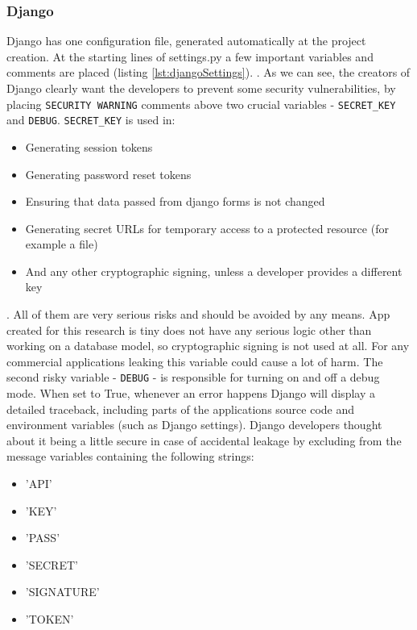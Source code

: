 \subsubsection{Django}
Django has one configuration file, generated automatically at the project creation. At the starting lines of settings.py a few important variables and comments are placed (listing \ref{lst:djangoSettings}).
.
As we can see, the creators of Django clearly want the developers to prevent some security vulnerabilities, by placing \lstinline{SECURITY WARNING} comments above two crucial variables - \lstinline{SECRET_KEY} and \lstinline{DEBUG}.
\lstinline{SECRET_KEY} is used in:
\begin{itemize}
    \item Generating session tokens
    \item Generating password reset tokens
    \item Ensuring that data passed from django forms is not changed
    \item Generating secret URLs for temporary access to a protected resource (for example a file)
    \item And any other cryptographic signing, unless a developer provides a different key
\end{itemize}.
All of them are very serious risks and should be avoided by any means. App created for this research is tiny does not have any serious logic other than working on a database model, so cryptographic signing is not used at all. For any commercial applications leaking this variable could cause a lot of harm.
The second risky variable - \lstinline{DEBUG} - is responsible for turning on and off a debug mode. When set to True, whenever an error happens Django will display a detailed traceback, including parts of the applications source code and environment variables (such as Django settings).
Django developers thought about it being a little secure in case of accidental leakage by excluding from the message variables containing the following strings:
\begin{itemize}
    \item 'API'
    \item 'KEY'
    \item 'PASS'
    \item 'SECRET'
    \item 'SIGNATURE'
    \item 'TOKEN'
\end{itemize}

